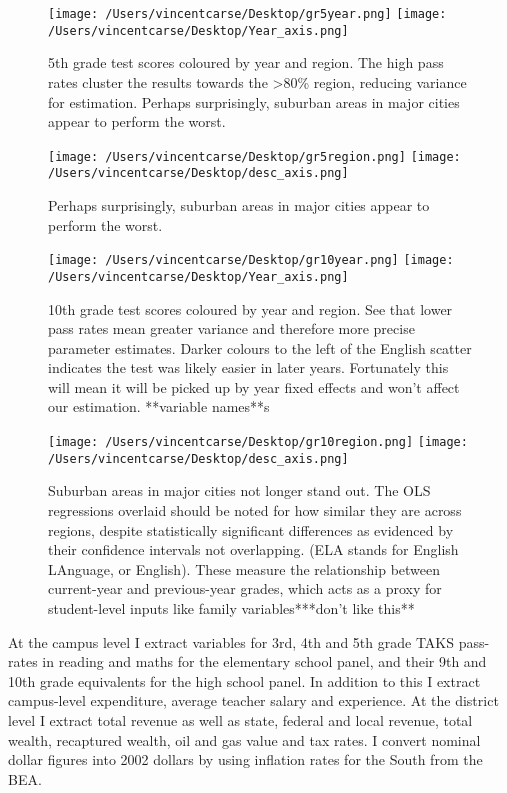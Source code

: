\documentclass[11pt]{article}
\begin{document}
\begin{figure}
    \label{Can I see this label?}
    \texttt{[image: /Users/vincentcarse/Desktop/gr5year.png]}
    \texttt{[image: /Users/vincentcarse/Desktop/Year\_axis.png]}
    \caption{5th grade test scores coloured by year and region. The high pass rates cluster the results towards the \textgreater80\% region, reducing variance for estimation. Perhaps surprisingly, suburban areas in major cities appear to perform the worst.}
\end{figure}

\begin{figure}
    \label{Can I see this label?}
    \texttt{[image: /Users/vincentcarse/Desktop/gr5region.png]}
    \texttt{[image: /Users/vincentcarse/Desktop/desc\_axis.png]}
    \caption{Perhaps surprisingly, suburban areas in major cities appear to perform the worst.}
\end{figure}

\begin{figure}
    \label{image-myimage}
    \texttt{[image: /Users/vincentcarse/Desktop/gr10year.png]}
    \texttt{[image: /Users/vincentcarse/Desktop/Year\_axis.png]}
    \caption{10th grade test scores coloured by year and region. See that lower pass rates mean greater variance and therefore more precise parameter estimates. Darker colours to the left of the English scatter indicates the test was likely easier in later years. Fortunately this will mean it will be picked up by year fixed effects and won't affect our estimation. **variable names**s}
\end{figure}

\begin{figure}
    \label{image-myimage}
    \texttt{[image: /Users/vincentcarse/Desktop/gr10region.png]}
    \texttt{[image: /Users/vincentcarse/Desktop/desc\_axis.png]}
    \caption{Suburban areas in major cities not longer stand out. The OLS regressions overlaid should be noted for how similar they are across regions, despite statistically significant differences as evidenced by their confidence intervals not overlapping. (ELA stands for English LAnguage, or English). These measure the relationship between current-year and previous-year grades, which acts as a proxy for student-level inputs like family variables***don't like this**}
\end{figure}

At the campus level I extract variables for 3rd, 4th and 5th grade TAKS pass-rates in reading and maths for the elementary school panel, and their 9th and 10th grade equivalents for the high school panel. In addition to this I extract campus-level expenditure, average teacher salary and experience. At the district level I extract total revenue as well as state, federal and local revenue, total wealth, recaptured wealth, oil and gas value and tax rates. I convert nominal dollar figures into 2002 dollars by using inflation rates for the South from the BEA.
\end{document}
